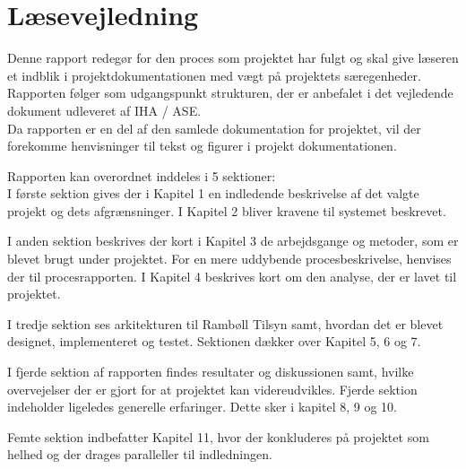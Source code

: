 \chapter*{Læsevejledning}
Denne rapport redegør for den proces som projektet har fulgt og skal give læseren et indblik i projektdokumentationen med vægt på projektets særegenheder. Rapporten følger som udgangspunkt strukturen, der er anbefalet i det vejledende dokument udleveret af IHA / ASE.\\
Da rapporten er en del af den samlede dokumentation for projektet, vil der forekomme
henvisninger til tekst og figurer i projekt dokumentationen.


Rapporten kan overordnet inddeles i 5 sektioner:\\
I første sektion gives der i Kapitel 1 en indledende beskrivelse af det valgte projekt og
dets afgrænsninger. I Kapitel 2 bliver kravene til systemet beskrevet.

I anden sektion beskrives der kort i Kapitel 3 de arbejdsgange og metoder, som er blevet brugt
under projektet. For en mere uddybende procesbeskrivelse, henvises der til procesrapporten.
I Kapitel 4 beskrives kort om den analyse, der er lavet til projektet.

I tredje sektion ses arkitekturen til Rambøll Tilsyn samt, hvordan det er blevet designet, implementeret og testet. 
Sektionen dækker over Kapitel 5, 6 og 7.

I fjerde sektion af rapporten findes resultater og diskussionen samt, hvilke overvejelser
der er gjort for at projektet kan videreudvikles. Fjerde sektion indeholder ligeledes generelle erfaringer. 
Dette sker i kapitel 8, 9 og 10.

Femte sektion indbefatter Kapitel 11, hvor der konkluderes på projektet som helhed og
der drages paralleller til indledningen.

